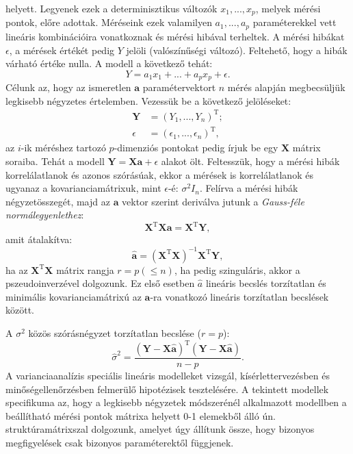 \documentclass[DIV=15,appendixprefix]{scrreprt}
\theoremstyle{definition}
\theoremstyle{remark}
\DeclareMathOperator{\T}{T}
\begin{document}
helyett. Legyenek ezek a determinisztikus változók $x_1,...,x_p$, melyek mérési pontok, előre
adottak. Méréseink ezek valamilyen $a_1,...,a_p$ paraméterekkel vett lineáris kombinációira
vonatkoznak és mérési hibával terheltek. A mérési hibákat $\epsilon$, a mérések értékét pedig $Y$
jelöli (valószínűségi változó). Feltehető, hogy a hibák várható értéke nulla. A modell a következő
tehát:
\begin{equation*}
	Y=a_1 x_1 + ... + a_p x_p + \epsilon.
\end{equation*}
Célunk az, hogy az ismeretlen $\mathbf{a}$ paramétervektort $n$ mérés alapján megbecsüljük legkisebb
négyzetes értelemben. Vezessük be a következő jelöléseket:
\begin{align*}
	\mathbf{Y} &= \left(Y_1,...,Y_n\right)^{\T};\\
	\epsilon &= (\epsilon_1,...,\epsilon_n)^{\T},
\end{align*}
az $i$-ik méréshez tartozó $p$-dimenziós pontokat pedig írjuk be egy $\mathbf{X}$ mátrix soraiba.
Tehát a modell $\mathbf{Y}=\mathbf{X} \mathbf{a} + \epsilon$ alakot ölt. Feltesszük, hogy a mérési
hibák korrelálatlanok és azonos szórásúak, ekkor a mérések is korrelálatlanok és ugyanaz a
kovarianciamátrixuk, mint $\epsilon$-é: $\sigma^2 I_n$. Felírva a mérési hibák négyzetösszegét, majd
az $\mathbf{a}$ vektor szerint deriválva jutunk a \emph{Gauss-féle normálegyenlethez}:
\begin{equation*}
	\mathbf{X}^{\T} \mathbf{X} \mathbf{a} = \mathbf{X}^{\T} \mathbf{Y},
\end{equation*}
amit átalakítva:
\[
\hat{\mathbf{a} } =\left( \mathbf{X}^{\T} \mathbf{X} \right) ^{-1} \mathbf{X}^{\T} \mathbf{Y},
\]
ha az $\mathbf{X}^{\T} \mathbf{X}$ mátrix rangja $r=p \left( \le n \right) $, ha pedig szinguláris,
akkor a pszeudoinverzével dolgozunk. Ez első esetben $\hat{a}$ lineáris becslés torzítatlan és
minimális kovarianciamátrixú az $\mathbf{a}$-ra vonatkozó lineáris torzítatlan becslések között.

A $\sigma ^2$ közös szórásnégyzet torzítatlan becslése ($r=p$):
\begin{equation*}
	\hat{\sigma}^2 =\frac{ \left( \mathbf{ Y } - \mathbf{ X } \hat{\mathbf{a} } \right) ^{ \T }
	\left( \mathbf{ Y } - \mathbf{ X } \hat{\mathbf{a} } \right) }{n-p}.
\end{equation*}
%
A varianciaanalízis speciális lineáris modelleket vizsgál, kísérlettervezésben és
minőségellenőrzésben felmerülő hipotézisek tesztelésére. A tekintett modellek
specifikuma az, hogy a legkisebb négyzetek módszerénél alkalmazott modellben a beállítható mérési
pontok mátrixa helyett 0-1 elemekből álló ún. struktúramátrixszal dolgozunk, amelyet úgy állítunk
össze, hogy bizonyos megfigyelések csak bizonyos paraméterektől függjenek.
\end{document}
